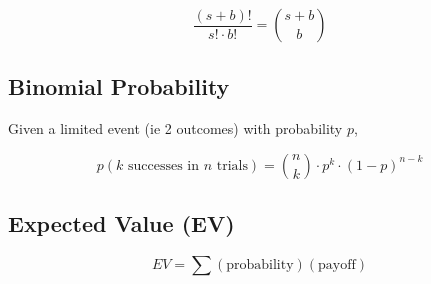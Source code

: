 \documentclass[../../Main.tex]{subfiles}
\begin{document}
$$\frac{(s + b)!}{s! \cdot b!} = {s + b \choose b}$$

\subsection{Binomial Probability}

Given a limited event (ie 2 outcomes) with probability $p$,

$$p(k \text{ successes in } n \text{ trials}) = {n \choose k} \cdot p^k \cdot (1 - p)^{n - k}$$

\subsection{Expected Value (EV)}

$$EV = \sum (\text{probability}) (\text{payoff})$$

\end{document}
